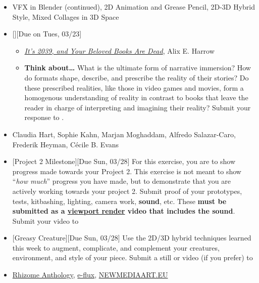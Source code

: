 \def\dMon{Mon, 03/22}
\def\dTues{Tues, 03/23}
\def\dWed{Wed, 03/24}
\def\dThur{Thur, 03/25}
\def\dFri{Fri, 03/26}
\def\dSat{Sat, 03/27}
\def\dSun{Sun, 03/28}
\placeDate

\begin{itemize}[noitemsep,topsep=0pt,leftmargin=*]
    \item {} VFX in Blender (continued), 2D Animation and Grease Pencil, 2D-3D Hybrid Style, Mixed Collages in 3D Space
    \item {}[][Due on \dTues]
    \begin{itemize}
        \item \href{https://www.nytimes.com/2019/12/02/opinion/future-virtual-reality-stories.html}{\emph{It’s 2039, and Your Beloved Books Are Dead}}, Alix E. Harrow
        \item \textbf{Think about\dots} What is the ultimate form of narrative immersion? How do formats shape, describe, and prescribe the reality of their stories? Do these prescribed realities, like those in video games and movies, form a homogenous understanding of reality in contrast to books that leave the reader in charge of interpreting and imagining their reality? Submit your response to \discordR.
    \end{itemize}
    \item {} Claudia Hart, Sophie Kahn, Marjan Moghaddam, Alfredo Salazar-Caro, Frederik Heyman, Cécile B. Evans
    \item {}[Project 2 Milestone][Due \dSun] For this exercise, you are to show progress made towards your Project 2. This exercise is not meant to show ``\emph{how much}'' progress you have made, but to demonstrate that you are actively working towards your project 2. Submit proof of your prototypes, tests, kitbashing, lighting, camera work, \textbf{sound}, etc. These \textbf{must be submitted as a \href{https://docs.blender.org/manual/en/latest/editors/3dview/viewport_render.html}{viewport render} video that includes the sound}. Submit your video to \discordE
    \item {}[Greasy Creature][Due \dSun] Use the 2D/3D hybrid techniques learned this week to augment, complicate, and complement your creatures, environment, and style of your piece. Submit a still or video (if you prefer) to \discordC
    \item {} \href{https://anthology.rhizome.org/}{Rhizome Anthology}, \href{https://www.e-flux.com/journal/}{e-flux}, \href{https://www.newmediaart.eu/}{NEWMEDIAART.EU}
\end{itemize}